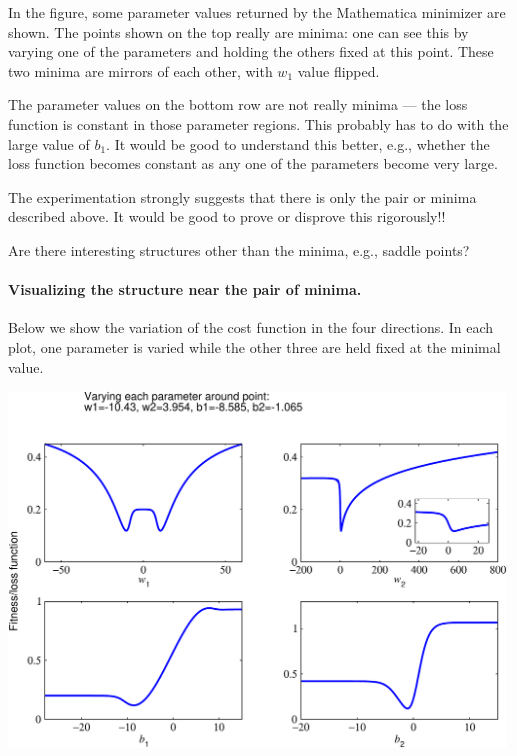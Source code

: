 \documentclass[12pt,a4paper]{article}
\begin{document}
In the figure, some parameter values returned by the Mathematica minimizer are shown.  The points
shown on the top really are minima: one can see this by varying one of the parameters and holding
the others fixed at this point.  These two minima are mirrors of each other, with $w_1$ value flipped.

The parameter values on the bottom row are not really minima --- the loss function is constant in
those parameter regions.  This probably has to do with the large value of $b_1$.  It would be good
to understand this better, e.g., whether the loss function becomes constant as any one of the
parameters become very large.  

The experimentation strongly suggests that there is only the pair or minima described above.  It
would be good to prove or disprove this rigorously!!   

Are there interesting structures other than the minima, e.g., saddle points?  



\paragraph{Visualizing the structure near the pair of minima.}

Below we show the variation of the cost function in the four directions.  In each plot, one
parameter is varied while the other three are held fixed at the minimal value.

\smallskip

\begin{center}
\includegraphics[width=0.99\textwidth]{Images/3node_largedomain_fitness_a_01}
\end{center}
\end{document}
